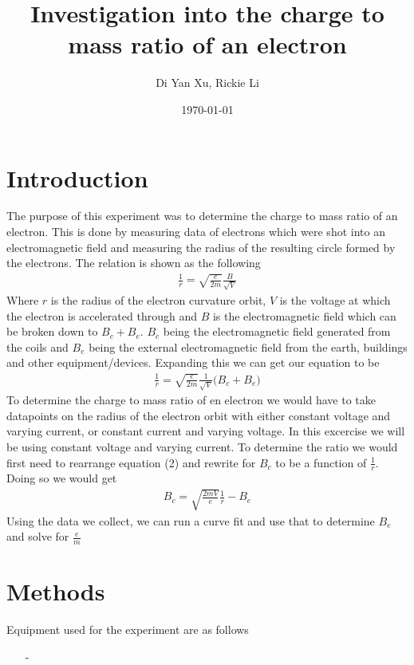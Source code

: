\documentclass{article}
\title{Investigation into the charge to mass ratio of an electron}
\author{Di Yan Xu, Rickie Li}
\date{\today}
\begin{document}
\maketitle

\newpage

\section{Introduction}
The purpose of this experiment was to determine the charge to mass ratio of an
electron. This is done by measuring data of electrons which were shot into
an electromagnetic field and measuring the radius of the resulting circle
formed by the electrons. The relation is shown as the following
\begin{align}
    \frac{1}{r} = \sqrt{\frac{e}{2m}}\frac{B}{\sqrt{V}}
\end{align}
Where $r$ is the radius of the electron curvature orbit, $V$ is the voltage at
which the electron is accelerated through and $B$ is the electromagnetic field
which can be broken down to $B_c + B_e$.
$B_c$ being the electromagnetic field generated from the coils and $B_e$ being
the external electromagnetic field from the earth, buildings and other 
equipment/devices. Expanding this we can get our equation to be
\begin{align}
    \frac{1}{r} = \sqrt{\frac{e}{2m}} \frac{1}{\sqrt{V}}\big(B_c + B_e\big)
\end{align}
To determine the charge to mass ratio of en electron we would have to take
datapoints on the radius of the electron orbit with either constant voltage and
varying current, or constant current and varying voltage. In this excercise we
will be using constant voltage and varying current. To determine the ratio we
would first need to rearrange equation (2) and rewrite for $B_c$ to be a function
of $\frac{1}{r}$. Doing so we would get
\begin{align}
    B_c = \sqrt{\frac{2mV}{e}}\frac{1}{r} - B_e
\end{align}
Using the data we collect, we can run a curve fit and use that to
determine $B_e$ and solve for $\frac{e}{m}$


\section{Methods}
Equipment used for the experiment are as follows
\begin{itemize}
    \item[-] 
\end{itemize}
\end{document}
